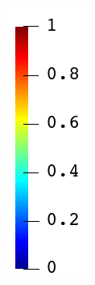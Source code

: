 \begin{figure}[!htb]
\begin{subfigure}{0.04\textwidth}
    \includegraphics[width=\textwidth,scale=0.5]{Chapter5/figures/SFC/colorbar_We_vertical}
    \vspace{1em}
  \end{subfigure}
  

\end{figure}
